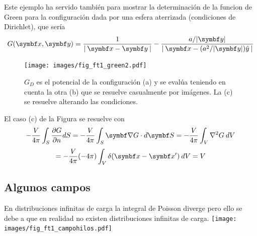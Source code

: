 \documentclass[10pt,oneside]{CBFT_book}
\begin{document}
Este ejemplo ha servido también para mostrar la determinación de la funcion de Green para la configuración
dada por una esfera aterrizada (condiciones de Dirichlet), que sería
\[
	G(\vbx,\vb{y}) = \frac{1}{| \: \vbx - \vb{y} \:|} - \frac{a/|\vb{y}|}{| \:\vbx - ( a^2 / |\vb{y}| ) \hat{y} \: |} 
\]

\begin{figure}[htb]
	\begin{center}
	\texttt{[image: images/fig\_ft1\_green2.pdf]}	 
	\end{center}
	\caption{$G_D$ es el potencial de la configuración (a) y se evalúa teniendo en cuenta la
	otra (b) que se resuelve casualmente por imágenes. La (c) se resuelve alterando las condiciones.}
\end{figure} 

El caso (c) de la Figura se resuelve con 
\[
	-\frac{V}{4\pi} \int_S \dpar{G}{n} dS = -\frac{V}{4\pi} \int_S \Nabla G\cdot d\vb{S} =
	-\frac{V}{4\pi} \int_V \lapm{G} \: dV	
\]
\[
	= -\frac{V}{4\pi} (-4\pi)\int_V \delta(\vb{x}-\vb{x}') \: dV	= V 
\]

\subsection{Algunos campos}

En distribuciones infinitas de carga la integral de Poisson diverge pero ello se debe a que en
realidad no existen distribuciones infinitas de carga.
	\texttt{[image: images/fig\_ft1\_campohilos.pdf]}	 
\end{document}
